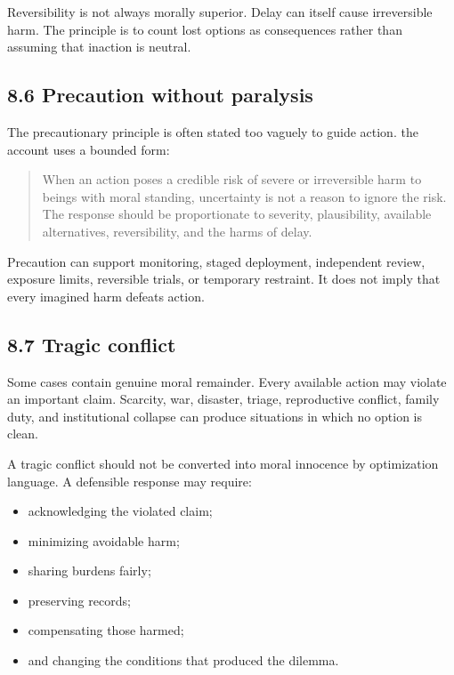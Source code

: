 \documentclass[
  11pt,
]{article}
\providecommand{\tightlist}{%
  \setlength{\itemsep}{0pt}\setlength{\parskip}{0pt}}
\begin{document}
Reversibility is not always morally superior. Delay can itself cause
irreversible harm. The principle is to count lost options as
consequences rather than assuming that inaction is neutral.

\subsection{8.6 Precaution without
paralysis}\label{precaution-without-paralysis}

The precautionary principle is often stated too vaguely to guide action.
the account uses a bounded form:

\begin{quote}
When an action poses a credible risk of severe or irreversible harm to
beings with moral standing, uncertainty is not a reason to ignore the
risk. The response should be proportionate to severity, plausibility,
available alternatives, reversibility, and the harms of delay.
\end{quote}

Precaution can support monitoring, staged deployment, independent
review, exposure limits, reversible trials, or temporary restraint. It
does not imply that every imagined harm defeats action.

\subsection{8.7 Tragic conflict}\label{tragic-conflict}

Some cases contain genuine moral remainder. Every available action may
violate an important claim. Scarcity, war, disaster, triage,
reproductive conflict, family duty, and institutional collapse can
produce situations in which no option is clean.

A tragic conflict should not be converted into moral innocence by
optimization language. A defensible response may require:

\begin{itemize}
\tightlist
\item
  acknowledging the violated claim;
\item
  minimizing avoidable harm;
\item
  sharing burdens fairly;
\item
  preserving records;
\item
  compensating those harmed;
\item
  and changing the conditions that produced the dilemma.
\end{itemize}
\end{document}
